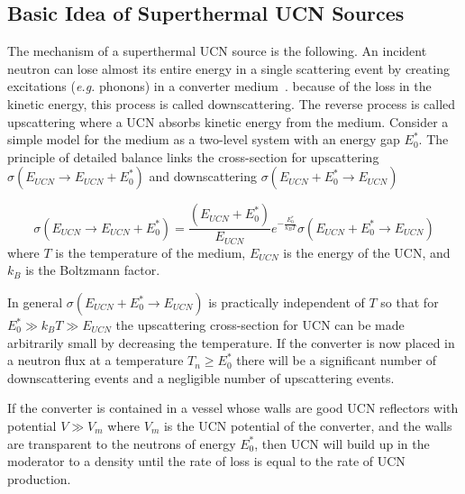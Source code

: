  
\subsection{Basic Idea of Superthermal UCN Sources\label{sec:basic_idea}}
The mechanism of a superthermal UCN source is the following.  An
incident neutron can lose almost its entire energy in a single
scattering event by creating excitations ({\it e.g.} phonons) in a
converter medium~\cite{ucnbook, Golub75}. because of the loss
in the kinetic energy, this process is called downscattering. The
reverse process is called upscattering where a UCN absorbs kinetic
energy from the medium.
Consider a simple model for the medium as a two-level system with an
energy gap $E_0^*$.
The principle of detailed balance links the cross-section for
upscattering $\sigma(E_{UCN} \rightarrow E_{UCN}+E_0^*)$ and
downscattering $\sigma(E_{UCN}+E_0^* \rightarrow
E_{UCN})$~\cite{ucnbook}

\begin{equation}
\label{eqn:detailed_balance}
\sigma(E_{UCN} \rightarrow E_{UCN}+E_0^*)= \frac{(E_{UCN}+E_0^*)}{E_{UCN}}
e^{-\frac{E_0^*}{k_B T}}\sigma(E_{UCN}+E_0^* \rightarrow E_{UCN})
\end{equation}
where $T$ is the temperature of the medium, $E_{UCN}$ is the energy of
the UCN, and $k_B$ is the Boltzmann factor.

In general $\sigma(E_{UCN}+E_0^* \rightarrow E_{UCN})$ is practically
independent of $T$ so that for $E_0^* \gg k_B T \gg E_{UCN}$ the
upscattering cross-section for UCN can be made arbitrarily small by
decreasing the temperature. If the converter is now placed in a
neutron flux at a temperature $T_n \geq E_0^*$ there will be a
significant number of downscattering events and a negligible number of
upscattering events.

If the converter is contained in a vessel whose walls are good UCN
reflectors with potential $V \gg V_m$ where $V_m$ is the UCN potential
of the converter, and the walls are transparent to the neutrons of
energy $E_0^*$, then UCN will build up in the moderator to a density
until the rate of loss is equal to the rate of UCN production.

